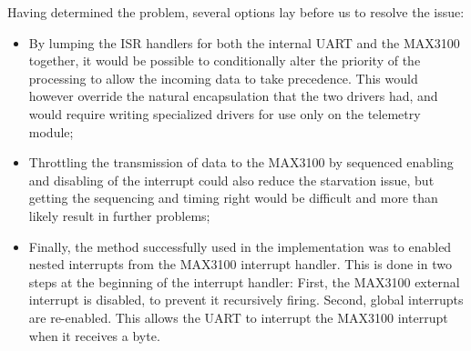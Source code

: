 Having determined the problem, several options lay before us to resolve the issue:
\begin{itemize}
  \item By lumping the ISR handlers for both the internal UART and the MAX3100 together, it would be possible to conditionally alter the priority of the processing to allow the incoming data to take precedence. This would however override the natural encapsulation that the two drivers had, and would require writing specialized drivers for use only on the telemetry module;
  \item Throttling the transmission of data to the MAX3100 by sequenced enabling and disabling of the interrupt could also reduce the starvation issue, but getting the sequencing and timing right would be difficult and more than likely result in further problems;
  \item Finally, the method successfully used in the implementation was to enabled nested interrupts from the MAX3100 interrupt handler. This is done in two steps at the beginning of the interrupt handler: First, the MAX3100 external interrupt is disabled, to prevent it recursively firing. Second, global interrupts are re-enabled. This allows the UART to interrupt the MAX3100 interrupt when it receives a byte.
\end{itemize}
